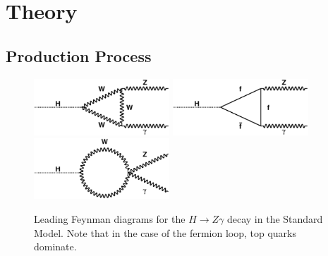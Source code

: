 \section{Theory}
\label{sec:theory}

\subsection{Production Process}
\begin{figure}[!htbp]
  \begin{center}
  {\includegraphics[width=2in]{figures/loop1}}
  {\includegraphics[width=2in]{figures/loop2}}
  {\includegraphics[width=2in]{figures/loop3}}
  \caption{Leading Feynman diagrams for the $H\rightarrow Z\gamma$
    decay in the Standard Model. Note that in the case of the fermion
    loop, top quarks dominate.} 
  \label{fig:feynman}
  \end{center}
\end{figure}

